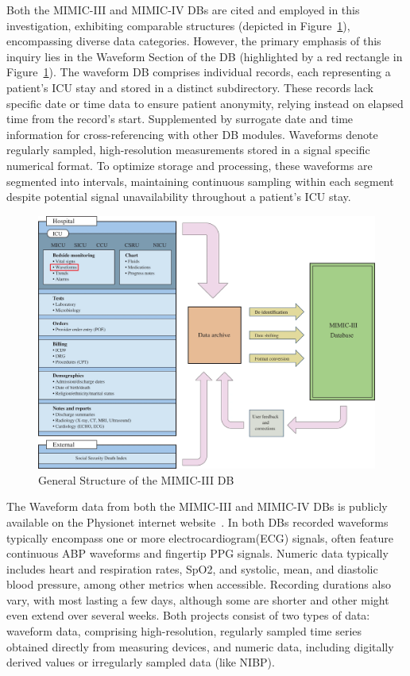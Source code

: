Both the MIMIC-III and MIMIC-IV DBs are cited and employed in this investigation, exhibiting comparable structures (depicted in Figure~\ref{fig:mimic_structure}), encompassing diverse data categories.
However, the primary emphasis of this inquiry lies in the Waveform Section of the DB (highlighted by a red rectangle in Figure~\ref{fig:mimic_structure}).
The waveform DB comprises individual records, each representing a patient's ICU stay and stored in a distinct subdirectory.
These records lack specific date or time data to ensure patient anonymity, relying instead on elapsed time from the record's start.
Supplemented by surrogate date and time information for cross-referencing with other DB modules.
Waveforms denote regularly sampled, high-resolution measurements stored in a signal specific numerical format.
To optimize storage and processing, these waveforms are segmented into intervals, maintaining continuous sampling within each segment despite potential signal unavailability throughout a patient's ICU stay.

\begin{figure}[h]
    \centering
    \includegraphics[scale=0.3]{images/mimic/mimic_structure}
    \caption{General Structure of the MIMIC-III DB~\cite{johnsonMIMICIIIFreelyAccessible2016}}
    \label{fig:mimic_structure}
\end{figure}

The Waveform data from both the MIMIC-III and MIMIC-IV DBs is publicly available on the Physionet internet website~\cite{moodyMIMICIIIWaveformDatabase2017, moodyMIMICIVWaveformDatabase}.
In both DBs recorded waveforms typically encompass one or more electrocardiogram(ECG) signals, often feature continuous ABP waveforms and fingertip PPG signals.
Numeric data typically includes heart and respiration rates, SpO2, and systolic, mean, and diastolic blood pressure, among other metrics when accessible.
Recording durations also vary, with most lasting a few days, although some are shorter and other might even extend over several weeks.
Both projects consist of two types of data: waveform data, comprising high-resolution, regularly sampled time series obtained directly from measuring devices, and numeric data, including digitally derived values or irregularly sampled data (like NIBP).

